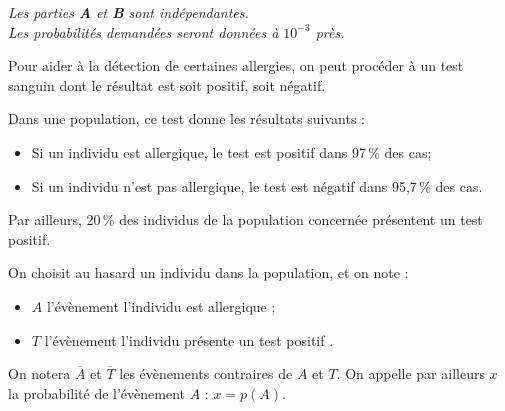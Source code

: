\medskip

\emph{Les parties \textbf{A} et \textbf{B} sont indépendantes.\\
Les probabilités demandées seront données à $10^{-3}$ près.}

Pour aider à la détection de certaines allergies, on peut procéder à un test sanguin dont le résultat est soit positif, soit négatif.

Dans une population, ce test donne les résultats suivants :
\begin{itemize}
\item Si un individu est allergique, le test est positif dans 97\,\% des cas;
\item Si un individu n'est pas allergique, le test est négatif dans 95,7\,\% des cas.
\end{itemize}

Par ailleurs, 20\,\% des individus de la population concernée présentent un test positif.

On choisit au hasard un individu dans la population, et on note :

\begin{itemize}
\item[$\bullet~~$] $A$ l'évènement \og l'individu est allergique \fg{} ;
\item[$\bullet~~$] $T$ l'évènement \og l'individu présente un test positif \fg.
\end{itemize}

On notera $\overline{A}$ et $\overline{T}$ les évènements contraires de $A$ et $T$.
On appelle par ailleurs $x$ la probabilité de l'évènement $A$ : $x = p(A)$.

